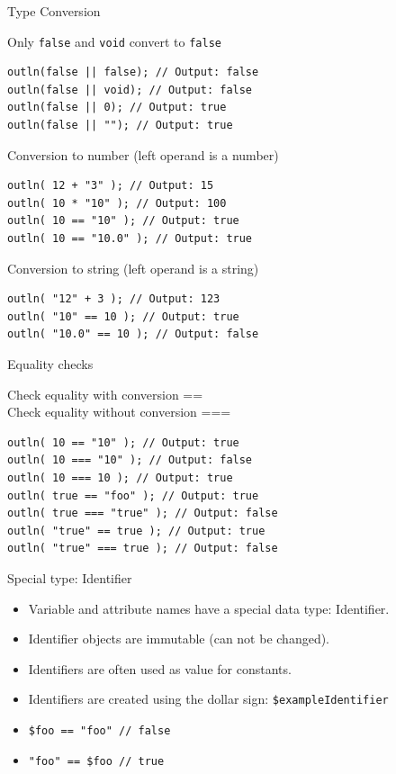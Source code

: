 \documentclass[ucs,9pt]{beamer}
\begin{document}
\begin{frame}[fragile]{Type Conversion}
	\begin{block}{Only \lstinline!false!  and \lstinline!void!  convert to \lstinline!false! }
		\begin{lstlisting}
outln(false || false); // Output: false
outln(false || void); // Output: false
outln(false || 0); // Output: true
outln(false || ""); // Output: true
		\end{lstlisting}
	\end{block}
	\pause
	\begin{block}{Conversion to number (left operand is a number)}
		\begin{lstlisting}
outln( 12 + "3" ); // Output: 15
outln( 10 * "10" ); // Output: 100
outln( 10 == "10" ); // Output: true
outln( 10 == "10.0" ); // Output: true
		\end{lstlisting}
	\end{block}
	\pause
	\begin{block}{Conversion to string (left operand is a string)}
		\begin{lstlisting}
outln( "12" + 3 ); // Output: 123
outln( "10" == 10 ); // Output: true
outln( "10.0" == 10 ); // Output: false
		\end{lstlisting}
	\end{block}
\end{frame}

\begin{frame}[fragile]{Equality checks}
		\begin{block}{Check equality with conversion == \\
		Check equality without conversion === }
		\begin{lstlisting}
outln( 10 == "10" ); // Output: true
outln( 10 === "10" ); // Output: false
outln( 10 === 10 ); // Output: true
outln( true == "foo" ); // Output: true
outln( true === "true" ); // Output: false
outln( "true" == true ); // Output: true
outln( "true" === true ); // Output: false
		\end{lstlisting}
	\end{block}
\end{frame}


\begin{frame}[fragile]{Special type: Identifier}
\begin{itemize}
	\item Variable and attribute names have a special data type: Identifier.
	\item Identifier objects are immutable (can not be changed).
	\item Identifiers are often used as value for constants.
	\item Identifiers are created using the dollar sign: \lstinline!$exampleIdentifier!
	\item \lstinline!$foo == "foo" // false!
	\item \lstinline!"foo" == $foo // true!
\end{itemize}
\end{frame}
\end{document}
